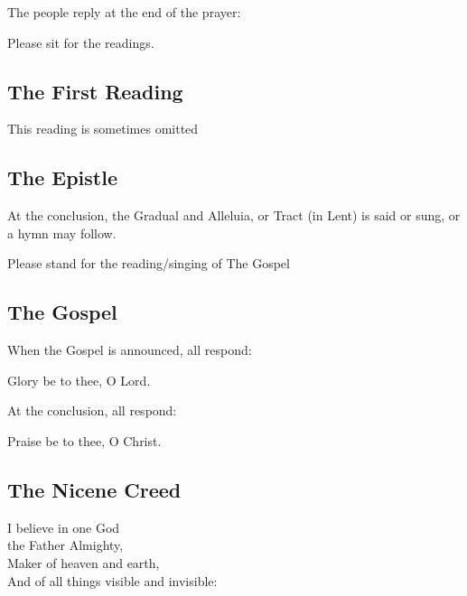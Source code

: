 \begin{rubric}
The people reply at the end of the prayer:\\
\end{rubric}

\begin{rubric}
Please sit for the readings.
\end{rubric}

\subsection{The First Reading}
\begin{rubric}
This reading is sometimes omitted
\end{rubric}

\subsection{The Epistle}
\begin{rubric}
At the conclusion, the Gradual and Alleluia, or Tract (in Lent) is said or sung, or a hymn may follow.
\end{rubric}

\begin{rubric}
Please stand for the reading/singing of The Gospel
\end{rubric}

\subsection{The Gospel}

\begin{rubric}
When the Gospel is announced, all respond:
\end{rubric}
\cross Glory be to thee, O Lord.

\begin{rubric}
At the conclusion, all respond:
\end{rubric}
Praise be to thee, O Christ.

\subsection{The Nicene Creed}

I believe in one God\\
the Father Almighty,\\
Maker of heaven and earth,\\
And of all things visible and invisible:\\

